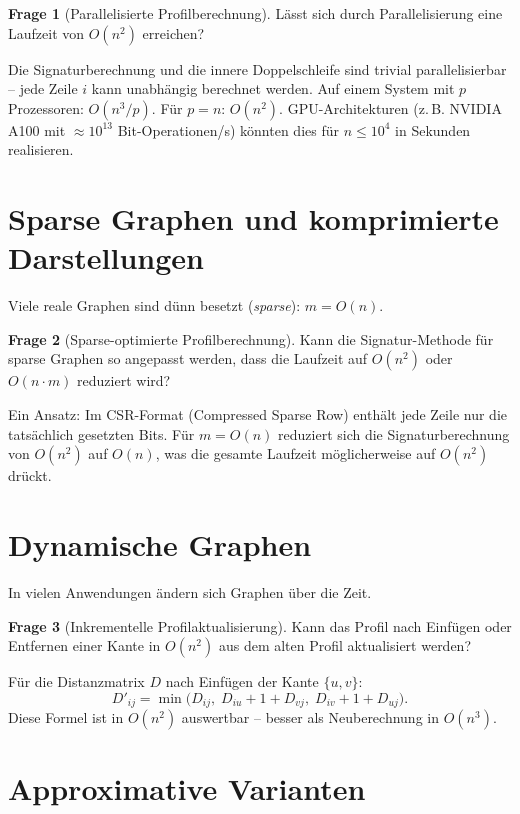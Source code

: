 ﻿\documentclass[a4paper,12pt,openany,oneside]{book}
\theoremstyle{definition}
\newtheorem{frage}{Frage}[chapter]
\theoremstyle{plain}
\theoremstyle{remark}
\begin{document}
\begin{frage}[Parallelisierte Profilberechnung]
  L\"asst sich durch Parallelisierung eine Laufzeit von $O(n^2)$ erreichen?
\end{frage}

Die Signaturberechnung und die innere Doppelschleife sind trivial
parallelisierbar -- jede Zeile $i$ kann unabh\"angig berechnet werden.
Auf einem System mit $p$ Prozessoren: $O(n^3/p)$. F\"ur $p = n$: $O(n^2)$.
GPU-Architekturen (z.\,B. NVIDIA A100 mit $\approx 10^{13}$ Bit-Operationen/s)
k\"onnten dies f\"ur $n \leq 10^4$ in Sekunden realisieren.

\section{Sparse Graphen und komprimierte Darstellungen}

Viele reale Graphen sind d\"unn besetzt (\emph{sparse}): $m = O(n)$.

\begin{frage}[Sparse-optimierte Profilberechnung]
  Kann die Signatur-Methode f\"ur sparse Graphen so angepasst werden,
  dass die Laufzeit auf $O(n^2)$ oder $O(n \cdot m)$ reduziert wird?
\end{frage}

Ein Ansatz: Im CSR-Format (Compressed Sparse Row) enth\"alt jede Zeile nur
die tats\"achlich gesetzten Bits. F\"ur $m = O(n)$ reduziert sich die
Signaturberechnung von $O(n^2)$ auf $O(n)$, was die gesamte Laufzeit
m\"oglicherweise auf $O(n^2)$ dr\"uckt.

\section{Dynamische Graphen}

In vielen Anwendungen \"andern sich Graphen \"uber die Zeit.

\begin{frage}[Inkrementelle Profilaktualisierung]
  Kann das Profil nach Einf\"ugen oder Entfernen einer Kante in $O(n^2)$
  aus dem alten Profil aktualisiert werden?
\end{frage}

F\"ur die Distanzmatrix $D$ nach Einf\"ugen der Kante $\{u,v\}$:
\[
  D'_{ij} = \min\bigl(D_{ij},\;
            D_{iu} + 1 + D_{vj},\;
            D_{iv} + 1 + D_{uj}\bigr).
\]
Diese Formel ist in $O(n^2)$ auswertbar -- besser als Neuberechnung in
$O(n^3)$.

\section{Approximative Varianten}
\end{document}
